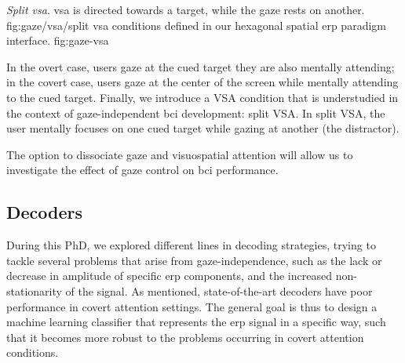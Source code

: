 {{  }{%
    \emph{Split \ac{vsa}}.
    \Ac{vsa} is directed towards a target, while the gaze rests on another.
  }{%
    fig:gaze/vsa/split
  }
}{%
}{%
  \Ac{vsa} conditions defined in our hexagonal spatial \ac{erp} paradigm interface.
}{%
  fig:gaze-vsa
}


In the overt case, users gaze at the cued
target they are also mentally attending; in the covert case, users
gaze at the center of the screen while mentally attending to the cued target.
Finally, we introduce a VSA condition that is understudied in the context of
gaze-independent \ac{bci} development: split VSA.
In split VSA, the user mentally focuses on one cued target while gazing at
another (the distractor).

The option to dissociate gaze and visuospatial attention will allow us to
investigate the effect of gaze control on \ac{bci} performance.

\subsection{Decoders}

During this PhD, we explored different lines in decoding strategies,
trying to tackle several problems that arise from gaze-independence, such as
the lack or decrease in amplitude of specific \ac{erp} components, and the increased
non-stationarity of the signal.
As mentioned, state-of-the-art decoders have poor performance in covert attention
settings.
The general goal is thus to design a machine learning classifier that represents
the \ac{erp} signal in a specific way, such that it becomes more robust to the problems
occurring in covert attention conditions.

